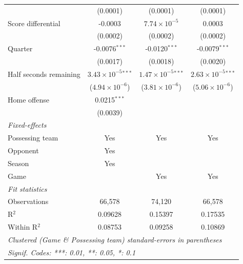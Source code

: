 \begin{table}[htbp]
\begin{tabular}{lccc}
                                              & (0.0001)                      & (0.0001)                      & (0.0001)\\   
      Score differential                      & -0.0003                       & $7.74\times 10^{-5}$          & 0.0003\\   
                                              & (0.0002)                      & (0.0002)                      & (0.0002)\\   
      Quarter                                 & -0.0076$^{***}$               & -0.0120$^{***}$               & -0.0079$^{***}$\\   
                                              & (0.0017)                      & (0.0018)                      & (0.0020)\\   
      Half seconds remaining                  & $3.43\times 10^{-5}$$^{***}$  & $1.47\times 10^{-5}$$^{***}$  & $2.63\times 10^{-5}$$^{***}$\\    
                                              & ($4.94\times 10^{-6}$)        & ($3.81\times 10^{-6}$)        & ($5.06\times 10^{-6}$)\\    
      Home offense                            & 0.0215$^{***}$                &                               &   \\   
                                              & (0.0039)                      &                               &   \\   
      \midrule
      \emph{Fixed-effects}\\
      Possessing team                         & Yes                           & Yes                           & Yes\\  
      Opponent                                & Yes                           &                               & \\  
      Season                                  & Yes                           &                               & \\  
      Game                                    &                               & Yes                           & Yes\\  
      \midrule
      \emph{Fit statistics}\\
      Observations                            & 66,578                        & 74,120                        & 66,578\\  
      R$^2$                                   & 0.09628                       & 0.15397                       & 0.17535\\  
      Within R$^2$                            & 0.08753                       & 0.09258                       & 0.10869\\  
      \midrule \midrule
      \multicolumn{4}{l}{\emph{Clustered (Game \& Possessing team) standard-errors in parentheses}}\\
      \multicolumn{4}{l}{\emph{Signif. Codes: ***: 0.01, **: 0.05, *: 0.1}}\\
   \end{tabular}
\end{table}


